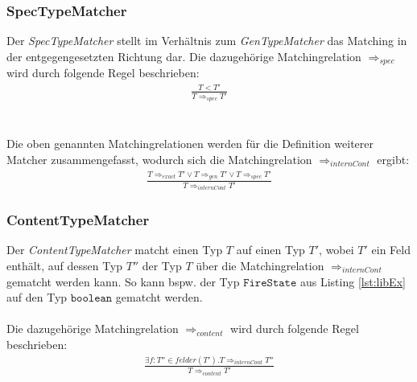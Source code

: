 \documentclass[a4paper,12pt]{article}
\begin{document}
\subsubsection{SpecTypeMatcher}
Der \emph{SpecTypeMatcher} stellt im Verhältnis zum \emph{GenTypeMatcher} das Matching in der entgegengesetzten Richtung dar. Die dazugehörige Matchingrelation $\Rightarrow_{spec}$ wird durch folgende Regel beschrieben: 
\begin{gather*}
\frac{T < T'}{T \Rightarrow_{spec} T'}
\end{gather*}
\\\\
Die oben genannten Matchingrelationen werden für die Definition weiterer Matcher zusammengefasst, wodurch sich die Matchingrelation $\Rightarrow_{internCont}$ ergibt:
\begin{gather*}
\frac{T \Rightarrow_{exact} T' \vee T \Rightarrow_{gen} T' \vee
T \Rightarrow_{spec} T'  }{T \Rightarrow_{internCont} T'}
\end{gather*}
\subsubsection{ContentTypeMatcher}
Der \emph{ContentTypeMatcher} matcht einen Typ $T$ auf einen Typ $T'$, wobei $T'$ ein Feld enthält, auf dessen Typ $T''$ der Typ $T$ über die Matchingrelation $\Rightarrow_{internCont}$ gematcht werden kann. So kann bspw. der Typ $\texttt{FireState}$ aus Listing \ref{lst:libEx} auf den Typ $\texttt{boolean}$ gematcht werden.
\\\\
Die dazugehörige Matchingrelation $\Rightarrow_{content}$ wird durch folgende Regel beschrieben:
\begin{gather*}
\frac{\exists f:T''\in felder(T'). T \Rightarrow_{internCont} T''}{T \Rightarrow_{content} T'}
\end{gather*}
\end{document}
